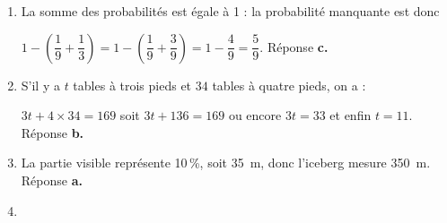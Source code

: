 \documentclass[10pt]{article}
\begin{document}
\begin{enumerate}
\item %



La somme des probabilités est égale à 1  : la probabilité manquante est donc 

$1 - \left(\dfrac{1}{9} + \dfrac{1}{3} \right) = 1 - \left(\dfrac{1}{9} + \dfrac{3}{9} \right) = 1 - \dfrac{4}{9} = \dfrac{5}{9}$. Réponse \textbf{c.} 
\item %
 
S'il y a $t$ tables à trois pieds et $34$ tables à quatre pieds, on a :

$3t + 4 \times 34 = 169$ soit $3t + 136 = 169$ ou encore $3t = 33$ et enfin $t = 11$. Réponse \textbf{b.} 
\medskip
\item %
 

La partie visible représente 10\,\%, soit 35~m, donc l'iceberg mesure 350~m. Réponse \textbf{a.}
\medskip 
\item %


\end{enumerate}
\end{document}
